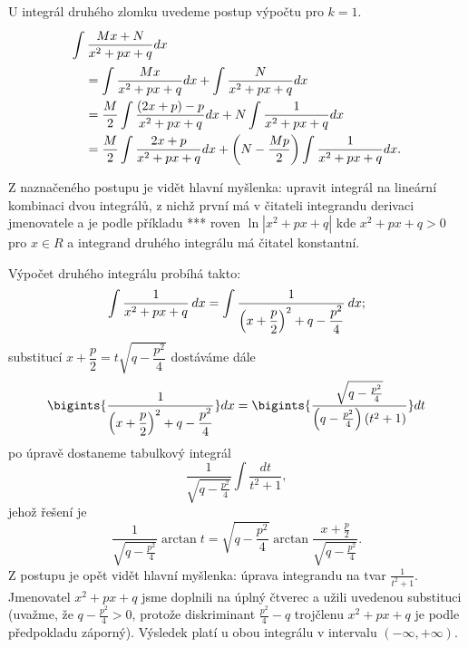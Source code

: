 {       U integrál druhého zlomku uvedeme postup výpočtu pro $k = 1$. 
      \begin{align*}
         \intertext{\(\displaystyle\int{\frac{Mx + N}{x^2+px+q}dx}\)}
           \quad &=  \int{\frac{Mx}{x^2+px+q}dx} + \int{\frac{N}{x^2+px+q}dx}                     
           \\  
           \quad &=  \frac{M}{2}\int{\frac{(2x + p) - p}{x^2+px+q}dx} + 
                     N\int{\frac{1}{x^2+px+q}dx}                                                   \\ 
           \quad &=  \frac{M}{2}\int{\frac{2x + p}{x^2+px+q}dx} + 
                      \left(N-\frac{Mp}{2}\right)\int{\frac{1}{x^2+px+q}dx.}                   
      \end{align*}  
      
      Z naznačeného postupu je vidět hlavní myšlenka: upravit integrál na lineární kombinaci dvou 
      integrálů, z nichž první má v čitateli integrandu derivaci jmenovatele a je podle příkladu 
      *** roven $\ln|x^2+px+q|$ kde $x^2+px+q >0$ pro $x\in R$ a integrand druhého integrálu má 
      čitatel konstantní.
      
      Výpočet druhého integrálu probíhá takto: 
      \begin{equation}\label{MA:int_ex_10}
        \int\dfrac{1}{x^2+px+q}\hspace{2pt}dx = 
          \int\dfrac{1}{\left(x+\dfrac{p}{2}\right)^2 + q - \dfrac{p^2}{4}}\hspace{2pt}dx;
      \end{equation}
      substitucí $x+\dfrac{p}{2} = t\sqrt{q - \dfrac{p^2}{4}}$ dostáváme dále
      \begin{equation*}\label{MA:int_ex_11}
        \bigints{\frac{1}{\displaystyle{\left(x+\frac{p}{2}\right)^2 + q - \frac{p^2}{4}}}}dx 
          =\displaystyle{
            \bigints{
              \frac{\sqrt{q-\frac{p^2}{4}}}{\left(q-\frac{p^2}{4}\right)(t^2+1)}}dt
            }   
      \end{equation*}
      po úpravě dostaneme tabulkový integrál
      \begin{equation}\label{MA:int_ex_12}
        \frac{1}{\sqrt{q-\frac{p^2}{4}}}\int{\frac{dt}{t^2+1}},
      \end{equation}
      jehož řešení je  
      \begin{equation*}\label{MA:int_ex_13}
        \frac{1}{\sqrt{q-\frac{p^2}{4}}}\arctan{t} 
          = \sqrt{q-\frac{p^2}{4}}\arctan\frac{x+\frac{p}{2}}{\sqrt{q-\frac{p^2}{4}}}.     
      \end{equation*}   
      Z postupu je opět vidět hlavní myšlenka: úprava integrandu na tvar $\frac{1}{t^2+1}$.
      Jmenovatel $x^2+px+q$ jsme doplnili na úplný čtverec a užili uvedenou substituci (uvažme,
      že $q-\frac{p^2}{4}>0$, protože diskriminant $\frac{p^2}{4}-q$ trojčlenu $x^2+px+q$ je
      podle předpokladu záporný). Výsledek platí u obou integrálu v intervalu \((-\infty,
      +\infty)\).
      
}
